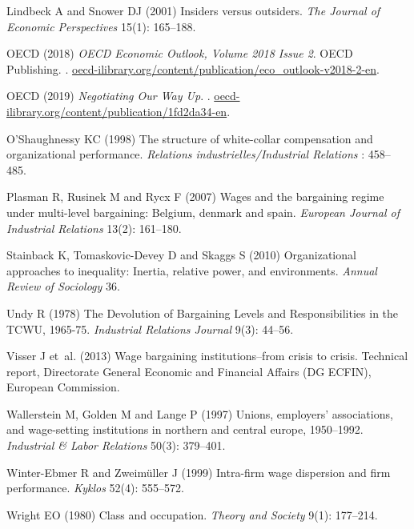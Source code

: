 \documentclass[12pt]{article}
\begin{document}
\begin{thebibliography}{38}
Lindbeck A and Snower DJ (2001) Insiders versus outsiders.
\newblock \emph{The Journal of Economic Perspectives} 15(1): 165--188.

OECD (2018) \emph{OECD Economic Outlook, Volume 2018 Issue 2}.
\newblock OECD Publishing.
\newblock
  .
\newblock
  \urlprefix\url{oecd-ilibrary.org/content/publication/eco\_outlook-v2018-2-en}.

OECD (2019) \emph{Negotiating Our Way Up}.
\newblock {}.
\newblock
  \urlprefix\url{oecd-ilibrary.org/content/publication/1fd2da34-en}.

O'Shaughnessy KC (1998) The structure of white-collar compensation and
  organizational performance.
\newblock \emph{Relations industrielles/Industrial Relations} : 458--485.

Plasman R, Rusinek M and Rycx F (2007) Wages and the bargaining regime under
  multi-level bargaining: Belgium, denmark and spain.
\newblock \emph{European Journal of Industrial Relations} 13(2): 161--180.

Stainback K, Tomaskovic-Devey D and Skaggs S (2010) Organizational approaches
  to inequality: Inertia, relative power, and environments.
\newblock \emph{Annual Review of Sociology} 36.

Undy R (1978) {The Devolution of Bargaining Levels and Responsibilities in the
  TCWU, 1965-75}.
\newblock \emph{Industrial Relations Journal} 9(3): 44--56.

Visser J et~al. (2013) Wage bargaining institutions--from crisis to crisis.
\newblock Technical report, Directorate General Economic and Financial Affairs
  (DG ECFIN), European Commission.

Wallerstein M, Golden M and Lange P (1997) Unions, employers' associations, and
  wage-setting institutions in northern and central europe, 1950--1992.
\newblock \emph{Industrial \& Labor Relations} 50(3): 379--401.

Winter-Ebmer R and Zweim{\"u}ller J (1999) Intra-firm wage dispersion and firm
  performance.
\newblock \emph{Kyklos} 52(4): 555--572.

Wright EO (1980) Class and occupation.
\newblock \emph{Theory and Society} 9(1): 177--214.

\end{thebibliography}
\end{document}
